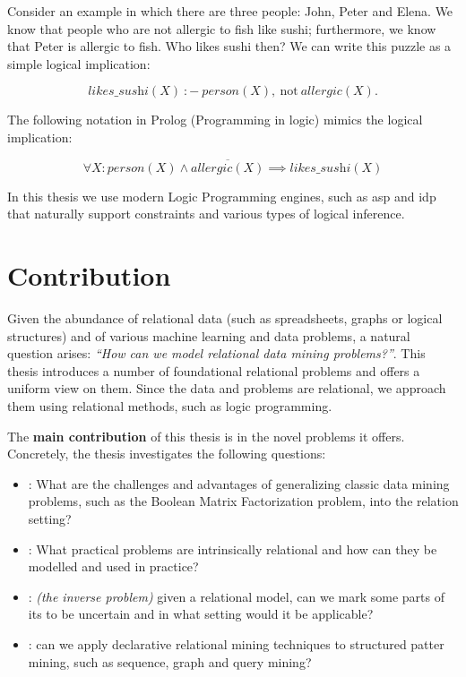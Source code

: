 Consider an example in which there are three people: John, Peter and Elena. 
We know that people who are not allergic to fish like sushi; 
furthermore, we know that Peter is allergic to fish. 
Who likes sushi then? We can write this puzzle as a
simple logical implication:

\begin{equation*}
  \textit{likes\_sushi}(X)~{:}{-}~\textit{person}(X),~\text{not}~
  \textit{allergic}(X). 
\end{equation*}

The following notation in Prolog (Programming in logic) mimics the logical implication:

\begin{equation*}
  \forall X: \textit{person}(X) \wedge \overline{\textit{allergic}(X)}
  \implies \textit{likes\_sushi}(X)
\end{equation*}

In this thesis we use modern Logic Programming engines, such
as \acrlong{asp} \parencite{ASPbook,whatisasp} and \acrlong{idp}
\parencite{idp} %
that naturally support constraints and various types of logical
inference.


\section{Contribution}
Given the abundance of relational data (such as spreadsheets, graphs
or logical structures) and of various machine learning and data
problems, a natural question arises: \textit{``How can we model
relational data mining problems?''}. This thesis introduces a number
of foundational relational problems and offers a uniform view on them.
Since the data and problems are relational, we approach them using
relational methods, such as logic programming. 

The \textbf{main contribution} of this thesis is in the novel problems
it offers. Concretely, the thesis investigates the following questions:
\begin{itemize}
  \item \cone: What are the challenges and advantages of generalizing
    classic data mining problems, such as the Boolean Matrix
    Factorization problem, into the relation setting?
  \item \ctwo: What practical problems are intrinsically relational and
    how can they be modelled and used in practice?
  \item \cthree: \textit{(the inverse problem)} given a relational
    model, can we mark some parts of its to be uncertain and in what
    setting would it be applicable?
  \item \cfour: 
    can we apply declarative relational mining
    techniques to structured patter mining, such as sequence, graph
    and query mining?
\end{itemize}

